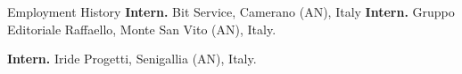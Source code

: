 \begin{rubric}{Employment History}
\entry*[2017]%
	\textbf{Intern.} Bit Service, Camerano (AN), Italy
%
%
\entry*[2017]%
	\textbf{Intern.} Gruppo Editoriale Raffaello, Monte San Vito (AN), Italy.

\entry*[2016]%
	\textbf{Intern.} Iride Progetti, Senigallia (AN), Italy.
%
\end{rubric}